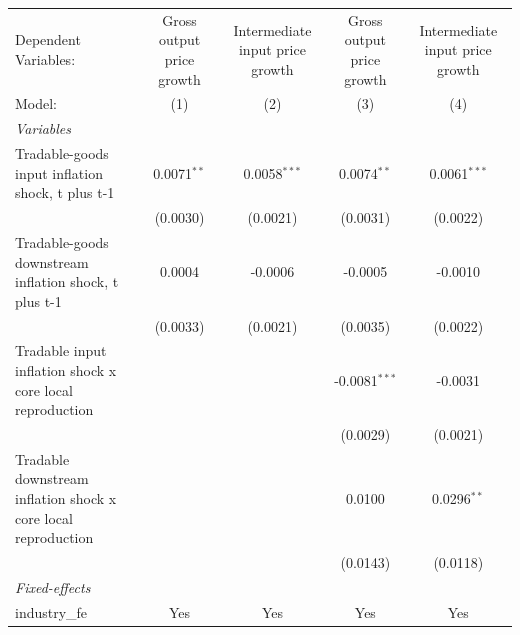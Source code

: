 \begingroup
\centering
\begin{tabular}{lcccc}
   \tabularnewline \midrule \midrule
   Dependent Variables:                                          & Gross output price growth & Intermediate input price growth & Gross output price growth & Intermediate input price growth\\  
   Model:                                                        & (1)                       & (2)                             & (3)                       & (4)\\  
   \midrule
   \emph{Variables}\\
   Tradable-goods input inflation shock, t plus t-1              & 0.0071$^{**}$             & 0.0058$^{***}$                  & 0.0074$^{**}$             & 0.0061$^{***}$\\   
                                                                 & (0.0030)                  & (0.0021)                        & (0.0031)                  & (0.0022)\\   
   Tradable-goods downstream inflation shock, t plus t-1         & 0.0004                    & -0.0006                         & -0.0005                   & -0.0010\\   
                                                                 & (0.0033)                  & (0.0021)                        & (0.0035)                  & (0.0022)\\   
   Tradable input inflation shock x core local reproduction      &                           &                                 & -0.0081$^{***}$           & -0.0031\\   
                                                                 &                           &                                 & (0.0029)                  & (0.0021)\\   
   Tradable downstream inflation shock x core local reproduction &                           &                                 & 0.0100                    & 0.0296$^{**}$\\   
                                                                 &                           &                                 & (0.0143)                  & (0.0118)\\   
   \midrule
   \emph{Fixed-effects}\\
   industry\_fe                                                  & Yes                       & Yes                             & Yes                       & Yes\\  

\end{tabular}
